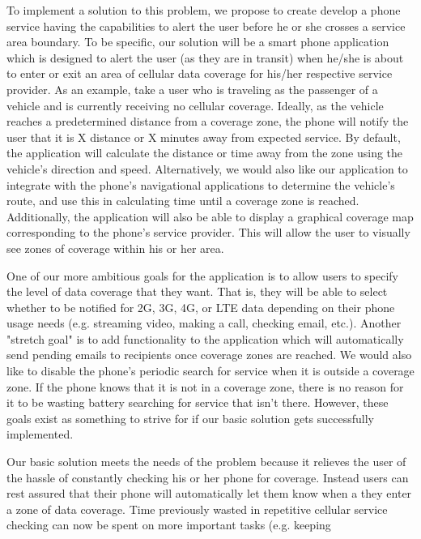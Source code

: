 \documentclass[letterpaper,10pt,draftclsnofoot,onecolumn]{IEEEtran}
\begin{document}
\par
To implement a solution to this problem, we propose to create develop a phone
service having the capabilities to alert the user before he or she
crosses a service area boundary. To be specific, our solution will be a smart
phone application which is designed to alert the user (as they are in transit)
when he/she is about to enter or exit an area of cellular data coverage for
his/her respective service provider. As an example, take a user who is traveling
as the passenger of a vehicle and is currently receiving no cellular coverage.
Ideally, as the vehicle reaches a predetermined distance from a coverage zone,
the phone will notify the user that it is X distance or X minutes away from
expected service. By default, the application will calculate the distance or
time away from the zone using the vehicle's direction and speed. Alternatively,
we would also like our application to integrate with the phone's navigational
applications to determine the vehicle's route, and use this in calculating time
until a coverage zone is reached. Additionally, the application will also be
able to display a graphical coverage map corresponding to the phone's service
provider. This will allow the user to visually see zones of coverage within his
or her area.\par
One of our more ambitious goals for the application is to allow users to specify
the level of data coverage that they want. That is, they will be able to select
whether to be notified for 2G, 3G, 4G, or LTE data depending on their phone
usage needs (e.g. streaming video, making a call, checking email, etc.). Another
"stretch goal" is to add functionality to the application which will
automatically send pending emails to recipients once coverage zones are reached.
We would also like to disable the phone's periodic search for service when it is
outside a coverage zone. If the phone knows that it is not in a coverage zone,
there is no reason for it to be wasting battery searching for service that isn't
there. However, these goals exist as something to strive for if our basic
solution gets successfully implemented.\par
Our basic solution meets the needs of the problem because it relieves the user
of the hassle of constantly checking his or her phone for coverage. Instead
users can rest assured that their phone will automatically let them know when a
they enter a zone of data coverage. Time previously wasted in repetitive
cellular service checking can now be spent on more important tasks (e.g. keeping
\end{document}
